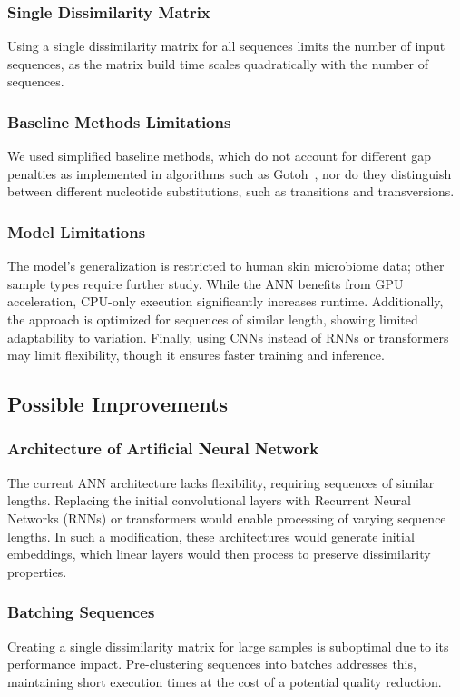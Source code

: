 \documentclass[biomedinformatics,article,submit,moreauthors]{Definitions/mdpi}
\begin{document}
            \subsubsection{Single Dissimilarity Matrix}
                Using a single dissimilarity matrix for all sequences limits the number of input sequences, as the matrix build time scales quadratically with the number of sequences.

            \subsubsection{Baseline Methods Limitations}
                We used simplified baseline methods, which do not account for different gap penalties as implemented in algorithms such as Gotoh~\citep{Gotoh1982}, nor do they distinguish between different nucleotide substitutions, such as transitions and transversions.

            \subsubsection{Model Limitations}
                The model's generalization is restricted to human skin microbiome data; other sample types require further study. While the ANN benefits from GPU acceleration, CPU-only execution significantly increases runtime. Additionally, the approach is optimized for sequences of similar length, showing limited adaptability to variation. Finally, using CNNs instead of RNNs or transformers may limit flexibility, though it ensures faster training and inference.

        \subsection{Possible Improvements}
            \subsubsection{Architecture of Artificial Neural Network}
                The current ANN architecture lacks flexibility, requiring sequences of similar lengths. Replacing the initial convolutional layers with Recurrent Neural Networks (RNNs) or transformers would enable processing of varying sequence lengths. In such a modification, these architectures would generate initial embeddings, which linear layers would then process to preserve dissimilarity properties.

            \subsubsection{Batching Sequences}
                Creating a single dissimilarity matrix for large samples is suboptimal due to its performance impact. Pre-clustering sequences into batches addresses this, maintaining short execution times at the cost of a potential quality reduction.
\end{document}
